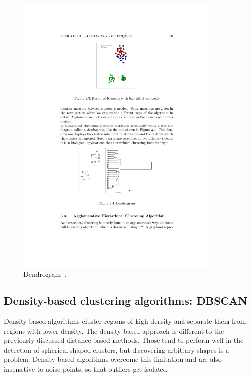 \begin{figure}[h]
  \begin{center}
    \includegraphics[width=0.9\textwidth]{figures/clustering_hierarchical_dendrogram.pdf}
    \caption{Dendrogram~\cite[p 20]{Meert06clustermaps}.}
    \label{fig:clustering-hierarchical-dendrogram}
  \end{center}
\end{figure}


\subsection{Density-based clustering algorithms: DBSCAN}

Density-based algorithms cluster regions of high density and separate them from regions with lower density. The density-based approach is different to the previously discussed distance-based methods. Those tend to perform well in the detection of spherical-shaped clusters, but discovering arbitrary shapes is a problem. Density-based algorithms overcome this limitation and are also insensitive to noise points, so that outliers get isolated.

